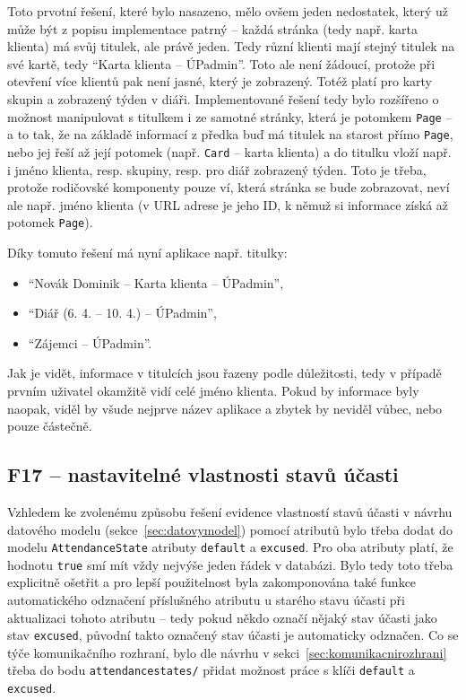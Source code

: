Toto prvotní řešení, které bylo nasazeno, mělo ovšem jeden nedostatek, který už může být z popisu implementace patrný -- každá stránka (tedy např. karta klienta) má svůj titulek, ale právě jeden. Tedy různí klienti mají stejný titulek na své kartě, tedy \enquote{Karta klienta -- ÚPadmin}. Toto ale není žádoucí, protože při otevření více klientů pak není jasné, který je zobrazený. Totéž platí pro karty skupin a zobrazený týden v diáři. Implementované řešení tedy bylo rozšířeno o možnost manipulovat s titulkem i ze samotné stránky, která je potomkem \verb|Page| -- a to tak, že na základě informací z předka buď má titulek na starost přímo \verb|Page|, nebo jej řeší až její potomek (např. \verb|Card| -- karta klienta) a do titulku vloží např. i jméno klienta, resp. skupiny, resp. pro diář zobrazený týden. Toto je třeba, protože rodičovské komponenty pouze ví, která stránka se bude zobrazovat, neví ale např. jméno klienta (v URL adrese je jeho ID, k němuž si informace získá až potomek \verb|Page|).

Díky tomuto řešení má nyní aplikace např. titulky: 

\begin{itemize}
    \item \enquote{Novák Dominik – Karta klienta – ÚPadmin},
    \item \enquote{Diář (6. 4. – 10. 4.) – ÚPadmin},
    \item \enquote{Zájemci – ÚPadmin}.
\end{itemize}

Jak je vidět, informace v titulcích jsou řazeny podle důležitosti, tedy v případě prvním uživatel okamžitě vidí celé jméno klienta. Pokud by informace byly naopak, viděl by všude nejprve název aplikace a zbytek by neviděl vůbec, nebo pouze částečně.

\subsection{F17 -- nastavitelné vlastnosti stavů účasti}

Vzhledem ke zvolenému způsobu řešení evidence vlastností stavů účasti v návrhu datového modelu (sekce~\ref{sec:datovymodel}) pomocí atributů bylo třeba dodat do modelu \verb|AttendanceState| atributy \verb|default| a \verb|excused|. Pro oba atributy platí, že hodnotu \verb|true| smí mít vždy nejvýše jeden řádek v databázi. Bylo tedy toto třeba explicitně ošetřit a pro lepší použitelnost byla zakomponována také funkce automatického odznačení příslušného atributu u starého stavu účasti při aktualizaci tohoto atributu -- tedy pokud někdo označí nějaký stav účasti jako stav \verb|excused|, původní takto označený stav účasti je automaticky odznačen. Co se týče komunikačního rozhraní, bylo dle návrhu v sekci~\ref{sec:komunikacnirozhrani} třeba do bodu \verb|attendancestates/| přidat možnost práce s klíči \verb|default| a \verb|excused|.

